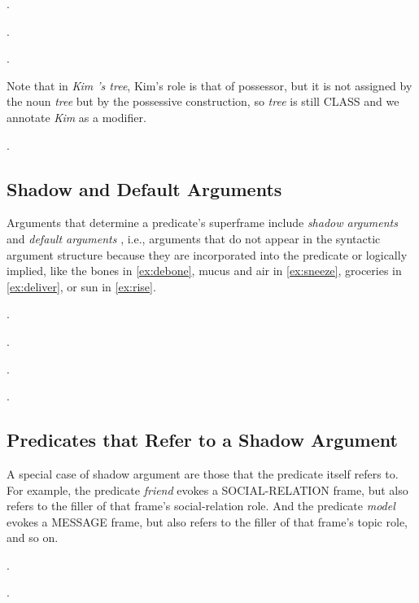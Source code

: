 \documentclass[a4paper]{article}
\newcommand{\fr}[1]{\textsf{#1}}
\newcommand{\rl}[1]{\textsf{#1}}
\begin{document}
\ex.

\ex.

\ex.

Note that in \emph{Kim 's tree}, Kim's role is that of \rl{possessor}, but it is not assigned by the noun \emph{tree} but by the possessive construction, so \emph{tree} is still \fr{CLASS} and we annotate \emph{Kim} as a modifier.

\ex.


\newpage\subsection{Shadow and Default Arguments}

Arguments that determine a predicate's superframe include \emph{shadow
arguments} and \emph{default arguments}
\citep{pustejovsky-1995-generative,di-fabio-etal-2019-verbatlas}, i.e.,
arguments that do not appear in the syntactic argument structure because they
are incorporated into the predicate or logically implied, like the bones in
\ref{ex:debone}, mucus and air in \ref{ex:sneeze}, groceries in
\ref{ex:deliver}, or sun in \ref{ex:rise}.

\ex.\label{ex:debone}

\ex.\label{ex:sneeze}

\ex.\label{ex:deliver}

\ex.\label{ex:rise}


\newpage\subsection{Predicates that Refer to a Shadow Argument}

A special case of shadow argument are those that the predicate itself refers
to. For example, the predicate \emph{friend} evokes a \fr{SOCIAL-RELATION}
frame, but also refers to the filler of that frame's \rl{social-relation} role.
And the predicate \emph{model} evokes a \fr{MESSAGE} frame, but also refers to
the filler of that frame's \rl{topic} role, and so on.

\ex.

\ex.
\end{document}
